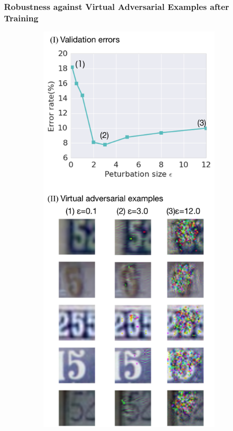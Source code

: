 \documentclass[10pt,journal,compsoc]{IEEEtran}
\begin{document}
\subsubsection{Robustness against Virtual Adversarial Examples after Training}

\begin{figure}
	\centering
    \hspace*{\fill}%
    \begin{subfigure}{0.35\textwidth}
 	\includegraphics[width=\textwidth]{svhn/vae.pdf}

\end{subfigure}
\end{figure}
\end{document}
